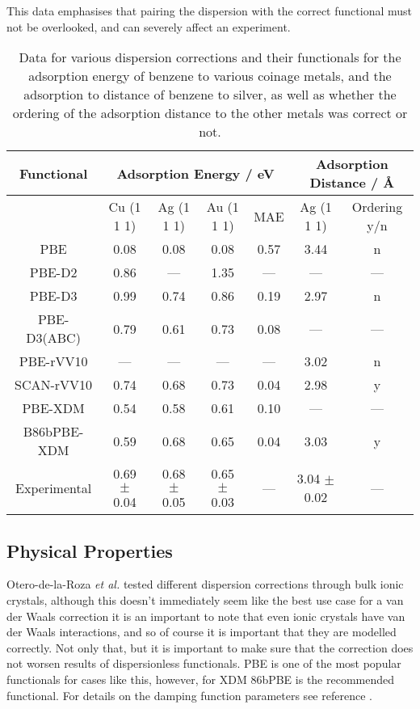 \documentclass[10pt,a4paper,twocolumn,twoside]{extarticle}
\newcommand{\al}{\emph{et al. }}
\newcommand{\oA}{\si{\angstrom}}
\begin{document}
	This data emphasises that pairing the dispersion with the correct functional must not be overlooked, and can severely affect an experiment. 

	\begin{table*}
		\centering
		\begin{tabular}[]{c|c c c c | c c}
		Functional & \multicolumn{4}{c}{Adsorption Energy / eV\cite{Christian2016-CoinageAdsorption}}\ & \multicolumn{2}{c}{Adsorption Distance / \oA\cite{VV10-Adsorption}}\\
			\hline
			& Cu (1 1 1) & Ag (1 1 1) & Au (1 1 1) & MAE & Ag (1 1 1) &  Ordering y/n\\
		PBE	& 0.08 & 0.08 & 0.08 & 0.57 & 3.44 & n\\
		PBE-D2 & 0.86 & --- & 1.35 & --- & --- & ---\\
		PBE-D3 & 0.99 & 0.74 & 0.86 & 0.19 & 2.97 & n\\
		PBE-D3(ABC) & 0.79 & 0.61 & 0.73 & 0.08 & --- & ---\\
		PBE-rVV10 & --- & --- & --- & --- & 3.02 & n \\
		SCAN-rVV10 & 0.74 & 0.68 & 0.73 & 0.04 & 2.98 & y\\
		PBE-XDM & 0.54 & 0.58 & 0.61 & 0.10 & --- & ---\\
		B86bPBE-XDM & 0.59 & 0.68 & 0.65 & 0.04 & 3.03 & y\\
		Experimental & 0.69 $\pm$ 0.04 & 0.68 $\pm$ 0.05 & 0.65 $\pm$ 0.03 & --- & 3.04 $\pm$ 0.02 & ---
		\end{tabular}
		\caption{Data for various dispersion corrections and their functionals for the adsorption energy of benzene to various coinage metals\cite{Christian2016-CoinageAdsorption}, and the adsorption to distance of benzene to silver, as well as whether the ordering of the adsorption distance to the other metals was correct or not.\cite{VV10-Adsorption}}
		\label{tab:adsorption}
	\end{table*}


	\subsection{Physical Properties}
	Otero-de-la-Roza \al tested different dispersion corrections through bulk ionic crystals\cite{Roza-2020-XDM}, although this doesn't immediately seem like the best use case for a van der Waals correction it is an important to note that even ionic crystals have van der Waals interactions, and so of course it is important that they are modelled correctly. Not only that, but it is important to make sure that the correction does not worsen results of dispersionless functionals. PBE is one of the most popular functionals for cases like this, however, for XDM 86bPBE is the recommended functional. For details on the damping function parameters see reference \cite{PBE-underbinding}. 
	
\end{document}
